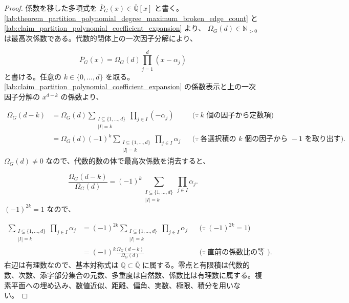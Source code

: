 \documentclass[11pt,a4paper]{article}
\theoremstyle{remark}
\begin{document}
\begin{proof}
係数を移した多項式を 
$\overline P_G(x)\in\overline{\mathbb Q}[x]$
 と書く。
\cref{lab:theorem_partition_polynomial_degree_maximum_broken_edge_count}
 と 
\cref{lab:claim_partition_polynomial_coefficient_expansion}
 より、
$\Omega_G(d)\in\mathbb N_{>0}$
 は最高次係数である。代数的閉体上の一次因子分解により、

\[\overline P_G(x)
=
\Omega_G(d)\prod_{j=1}^{d}(x-\alpha_j)\]
と書ける。任意の 
$k\in\{0,\ldots,d\}$
 を取る。
\cref{lab:claim_partition_polynomial_coefficient_expansion}
 の係数表示と上の一次因子分解の 
$x^{d-k}$
 の係数より、

\[\begin{aligned}
\Omega_G(d-k)
&=
\Omega_G(d)
\sum_{\substack{I\subseteq\{1,\ldots,d\}\\|I|=k}}
\prod_{j\in I}(-\alpha_j)
&&\bigl(\because\ k\text{ 個の因子から定数項を選ぶ}\bigr)\\
&=
\Omega_G(d)(-1)^k
\sum_{\substack{I\subseteq\{1,\ldots,d\}\\|I|=k}}
\prod_{j\in I}\alpha_j
&&\bigl(\because\ \text{各選択積の }k\text{ 個の因子から }-1\text{ を取り出す}\bigr).
\end{aligned}\]
$\Omega_G(d)\ne0$
 なので、代数的数の体で最高次係数を消去すると、

\[\frac{\Omega_G(d-k)}{\Omega_G(d)}
=
(-1)^k
\sum_{\substack{I\subseteq\{1,\ldots,d\}\\|I|=k}}
\prod_{j\in I}\alpha_j.\]
$(-1)^{2k}=1$
 なので、

\[\begin{aligned}
\sum_{\substack{I\subseteq\{1,\ldots,d\}\\|I|=k}}
\prod_{j\in I}\alpha_j
&=
(-1)^{2k}
\sum_{\substack{I\subseteq\{1,\ldots,d\}\\|I|=k}}
\prod_{j\in I}\alpha_j
&&\bigl(\because\ (-1)^{2k}=1\bigr)\\
&=
(-1)^k\frac{\Omega_G(d-k)}{\Omega_G(d)}
&&\bigl(\because\ \text{直前の係数比の等式}\bigr).
\end{aligned}\]
右辺は有理数なので、基本対称式は 
$\mathbb Q\subset\overline{\mathbb Q}$
 に属する。零点と有限積は代数的数、次数、添字部分集合の元数、多重度は自然数、係数比は有理数に属する。複素平面への埋め込み、数値近似、距離、偏角、実数、極限、積分を用いない。

\end{proof}
\end{document}
